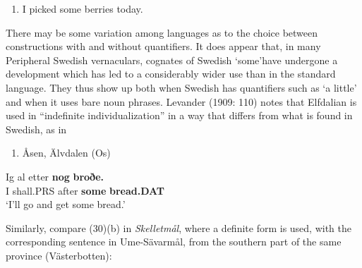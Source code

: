 \begin{enumerate} %
\item 
I picked some berries today.

\end{enumerate} %
There may be some variation among languages as to the choice between constructions with and without quantifiers. It does appear that, in many Peripheral Swedish vernaculars, cognates of Swedish  ‘some’\textstyleLinguisticExample{ }have undergone a development which has led to a considerably wider use than in the standard language. They thus show up both when Swedish has quantifiers such as  ‘a little’ and when it uses bare noun phrases. Levander (1909: 110) notes that Elfdalian is used in “indefinite individualization” in a way that differs from what is found in Swedish, as in 

\begin{enumerate} %
\item 
Åsen, Älvdalen (Os)

\end{enumerate} %
\ea\label{}
\gll Ig  al  etter  \textbf{nog}\textbf{  broðe.}\\


I  shall.PRS  after  \textbf{some} \textbf{bread.DAT}\\ %


‘I’ll go and get some bread.’ 
\z


Similarly, compare (30)(b) in \textit{Skelletmål}, where a definite form  is used, with the corresponding sentence in Ume-Sävarmål, from the southern part of the same province (Västerbotten):

